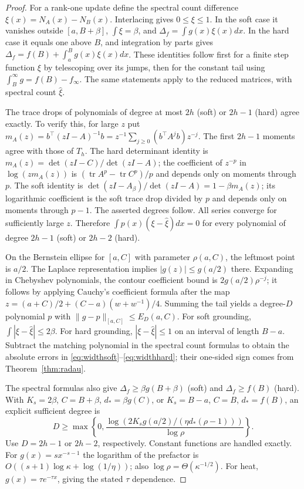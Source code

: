 \documentclass[11pt]{article}
\DeclareMathOperator{\tr}{tr}
\begin{document}
\begin{proof}
For a rank-one update define the spectral count difference
$\xi(x)=N_A(x)-N_B(x)$. Interlacing gives $0\leq\xi\leq1$.
In the soft case it vanishes outside $[a,B+\beta]$,
$\int\xi=\beta$, and $\Delta_f=\int g(x)\xi(x)dx$.
In the hard case it equals one above $B$, and integration by parts
gives $\Delta_f=f(B)+\int_a^B g(x)\xi(x)dx$.
These identities follow first for a finite step function $\xi$ by
telescoping over its jumps, then for the constant tail using
$\int_B^\infty g=f(B)-f_\infty$. The same statements apply to
the reduced matrices, with spectral count $\widehat\xi$.

The trace drops of polynomials of degree at most $2h$ (soft) or
$2h-1$ (hard) agree exactly. To verify this, for large $z$ put
$m_A(z)=b^\top(zI-A)^{-1}b=z^{-1}\sum_{j\geq0}(b^\top A^jb)z^{-j}$.
The first $2h-1$ moments agree with those of $T_h$.
The hard determinant identity is
$m_A(z)=\det(zI-C)/\det(zI-A)$; the coefficient of $z^{-p}$
in $\log(zm_A(z))$ is $(\tr A^p-\tr C^p)/p$ and depends only
on moments through $p$. The soft identity is
$\det(zI-A_\beta)/\det(zI-A)=1-\beta m_A(z)$;
its logarithmic coefficient is the soft trace drop divided by $p$
and depends only on moments through $p-1$. The asserted degrees
follow. All series converge for sufficiently large $z$.
Therefore $\int p(x)(\xi-\widehat\xi)dx=0$ for every polynomial
of degree $2h-1$ (soft) or $2h-2$ (hard).

On the Bernstein ellipse for $[a,C]$ with parameter $\rho(a,C)$,
the leftmost point is $a/2$. The Laplace representation implies
$|g(z)|\leq g(a/2)$ there. Expanding in Chebyshev polynomials,
the contour coefficient bound is $2g(a/2)\rho^{-j}$; it follows
by applying Cauchy's coefficient formula after the map
$z=(a+C)/2+(C-a)(w+w^{-1})/4$.
Summing the tail yields a degree-$D$ polynomial $p$ with
$\|g-p\|_{[a,C]}\leq E_D(a,C)$.
For soft grounding, $\int|\xi-\widehat\xi|\leq2\beta$.
For hard grounding, $|\xi-\widehat\xi|\leq1$ on an interval
of length $B-a$. Subtract the matching polynomial in the spectral
count formulas to obtain the absolute errors in
\eqref{eq:widthsoft}--\eqref{eq:widthhard}; their one-sided sign
comes from Theorem~\ref{thm:radau}.

The spectral formulas also give
$\Delta_f\geq\beta g(B+\beta)$ (soft) and
$\Delta_f\geq f(B)$ (hard). With $K_s=2\beta$, $C=B+\beta$,
$d_*=\beta g(C)$, or $K_s=B-a$, $C=B$, $d_*=f(B)$,
an explicit sufficient degree is
\[
 D\geq\max\left\{0,
 \frac{\log(2K_sg(a/2)/(\eta d_*(\rho-1)))}{\log\rho}\right\}.
\]
Use $D=2h-1$ or $2h-2$, respectively. Constant functions are handled
exactly. For $g(x)=sx^{-s-1}$ the logarithm of the prefactor is
$O((s+1)\log\kappa+\log(1/\eta))$; also
$\log\rho=\Theta(\kappa^{-1/2})$. For heat,
$g(x)=\tau e^{-\tau x}$, giving the stated $\tau$ dependence.


\end{proof}
\end{document}
